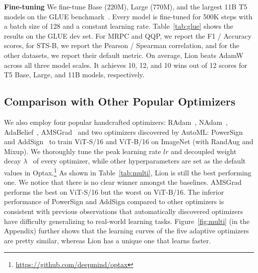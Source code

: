 \documentclass{article}
\newcommand{\name}{Lion}
\begin{document}
\textbf{Fine-tuning}
We fine-tune Base (220M), Large (770M), and the largest 11B T5~\citep{raffel2020t5} models on the GLUE benchmark~\citep{wang2018glue}.
Every model is fine-tuned for 500K steps with a batch size of 128 and a constant learning rate.
Table~\ref{tab:glue} shows the results on the GLUE dev set. 
For MRPC and QQP, we report the F1 / Accuracy scores, for STS-B, we report the Pearson / Spearman correlation, and for the other datasets, we report their default metric. 
On average, \name{} beats AdamW across all three model scales. 
It achieves 10, 12, and 10 wins out of 12 scores for T5 Base, Large, and 11B models, respectively.


\subsection{Comparison with Other Popular Optimizers}
\label{sec:multi}
We also employ four popular handcrafted optimizers: RAdam~\citep{liu2020radam}, NAdam~\citep{dozat2016nadam}, AdaBelief~\citep{zhuang2020adabelief}, AMSGrad~\citep{reddi2018amsgrad} and two optimizers discovered by AutoML: PowerSign~\citep{bello2017nos} and AddSign~\citep{bello2017nos} to train ViT-S/16 and ViT-B/16 on ImageNet (with RandAug and Mixup).
We thoroughly tune the peak learning rate $lr$ and decoupled weight decay $\lambda$~\citep{loshchilov2019adamw} of every optimizer, while other hyperparameters are set as the default values in Optax.\footnote{\url{https://github.com/deepmind/optax}}
As shown in Table~\ref{tab:multi}, \name{} is still the best performing one.
We notice that there is no clear winner amongst the baselines. AMSGrad performs the best on ViT-S/16 but the worst on ViT-B/16.
The inferior performance of PowerSign and AddSign compared to other optimizers is consistent with previous observations that automatically discovered optimizers have difficulty generalizing to real-world learning tasks.
Figure~\ref{fig:multi} (in the Appendix) further shows that the learning curves of the five adaptive optimizers are pretty similar, whereas \name{} has a unique one that learns faster.
\end{document}
